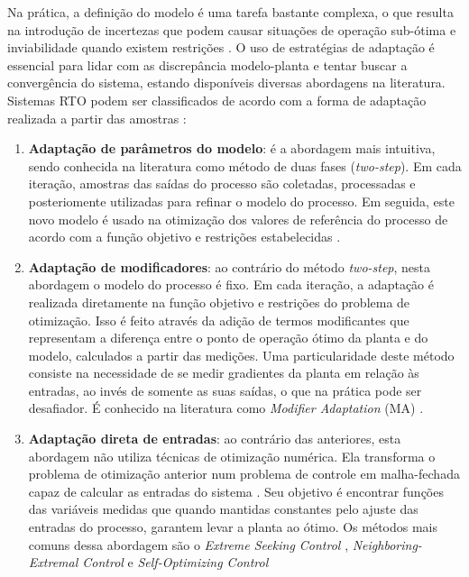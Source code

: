 \documentclass[conference]{IEEEtran}
\begin{document}
Na prática, a definição do modelo é uma tarefa bastante complexa, o que resulta na introdução de incertezas que podem causar situações de operação sub-ótima e inviabilidade quando existem restrições \cite{marchetti2009modifier}. O uso de estratégias de adaptação é essencial para lidar com as discrepância modelo-planta e tentar buscar a convergência do sistema, estando disponíveis diversas abordagens na literatura. 
Sistemas RTO podem ser classificados de acordo com a forma de adaptação realizada a partir das amostras \cite{marchetti2016modifier}:
\begin{enumerate}
	\itemsep=0em
	\item \textbf{Adaptação de parâmetros do modelo}: \label{list:twostep} é a abordagem mais intuitiva, sendo conhecida na literatura como método de duas fases (\textit{two-step}). Em cada iteração,  amostras das saídas do processo são coletadas, processadas e posteriomente utilizadas para refinar o modelo do processo. Em seguida, este novo modelo é usado na otimização dos valores de referência do processo de acordo com a função objetivo e restrições estabelecidas \cite{naysmith1995review, marlin1997real, san2002multiple, forbes1996design}.
	\item \textbf{Adaptação de modificadores}: ao contrário do método \textit{two-step}, nesta abordagem o modelo do processo é fixo. Em cada iteração, a adaptação é realizada diretamente na função objetivo e restrições do problema de otimização. Isso é feito através da adição de termos modificantes que representam a diferença entre o ponto de operação ótimo da planta e do modelo, calculados a partir das medições. Uma particularidade deste método consiste na necessidade de se medir gradientes da planta em relação às entradas, ao invés de somente as suas saídas, o que na prática pode ser desafiador. É conhecido na literatura como \textit{Modifier Adaptation} (MA) \cite{chachuat2009adaptation, marchetti2010dual}. \label{list:ma}
	\item \textbf{Adaptação direta de entradas}: ao contrário das anteriores, esta abordagem não utiliza técnicas de otimização numérica. Ela transforma o problema de otimização anterior num problema de controle em malha-fechada capaz de calcular as entradas do sistema \cite{franccois2005use}. Seu objetivo é encontrar funções das variáveis medidas que quando mantidas constantes pelo ajuste das entradas do processo, garantem levar a planta ao ótimo.  Os métodos mais comuns dessa abordagem são o \textit{Extreme Seeking Control} \cite{krstic2000stability}, \textit{Neighboring-Extremal Control} \cite{gros2009optimizing} e \textit{Self-Optimizing Control} \cite{skogestad2000self} \label{list:dia}
\end{enumerate}
\end{document}
